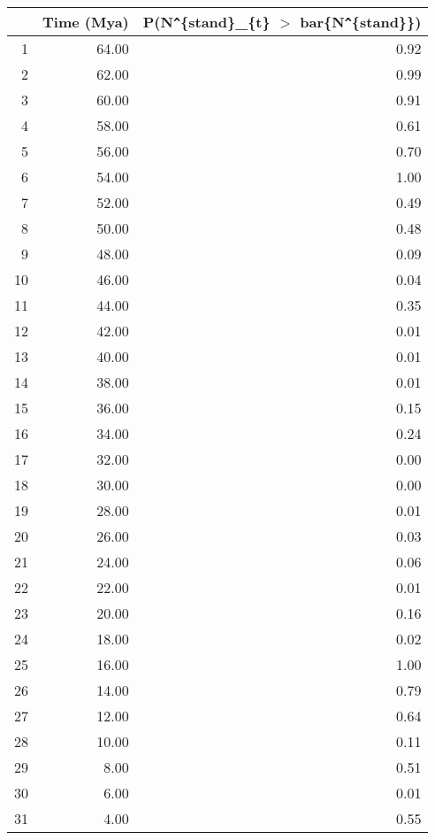 \begin{table}[ht]
\centering
\begin{tabular}{rrr}
  \hline
 & Time (Mya) & P(N\verb|^|\{stand\}\_\{t\} $>$ bar\{N\verb|^|\{stand\}\}) \\ 
  \hline
1 & 64.00 & 0.92 \\ 
  2 & 62.00 & 0.99 \\ 
  3 & 60.00 & 0.91 \\ 
  4 & 58.00 & 0.61 \\ 
  5 & 56.00 & 0.70 \\ 
  6 & 54.00 & 1.00 \\ 
  7 & 52.00 & 0.49 \\ 
  8 & 50.00 & 0.48 \\ 
  9 & 48.00 & 0.09 \\ 
  10 & 46.00 & 0.04 \\ 
  11 & 44.00 & 0.35 \\ 
  12 & 42.00 & 0.01 \\ 
  13 & 40.00 & 0.01 \\ 
  14 & 38.00 & 0.01 \\ 
  15 & 36.00 & 0.15 \\ 
  16 & 34.00 & 0.24 \\ 
  17 & 32.00 & 0.00 \\ 
  18 & 30.00 & 0.00 \\ 
  19 & 28.00 & 0.01 \\ 
  20 & 26.00 & 0.03 \\ 
  21 & 24.00 & 0.06 \\ 
  22 & 22.00 & 0.01 \\ 
  23 & 20.00 & 0.16 \\ 
  24 & 18.00 & 0.02 \\ 
  25 & 16.00 & 1.00 \\ 
  26 & 14.00 & 0.79 \\ 
  27 & 12.00 & 0.64 \\ 
  28 & 10.00 & 0.11 \\ 
  29 & 8.00 & 0.51 \\ 
  30 & 6.00 & 0.01 \\ 
  31 & 4.00 & 0.55 \\ 
   \hline
\end{tabular}
\label{tab:div_peak}
\end{table}
